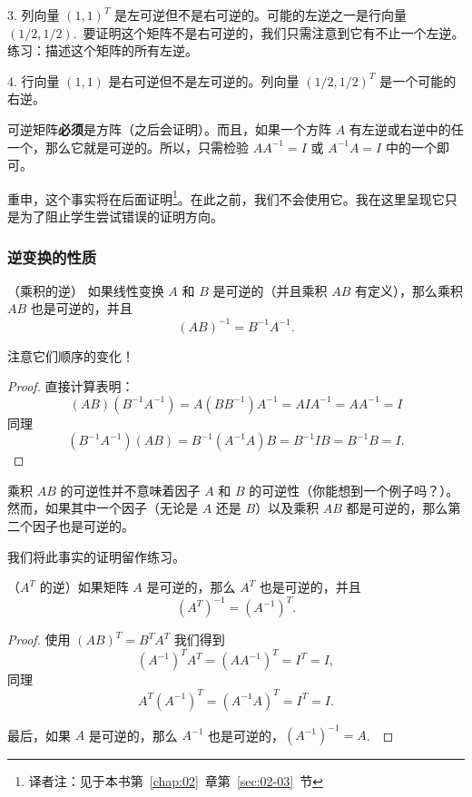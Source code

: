 3. 列向量 $(1, 1)^T$ 是左可逆但不是右可逆的。可能的左逆之一是行向量 $(1/2, 1/2)$.~要证明这个矩阵不是右可逆的，我们只需注意到它有不止一个左逆。 {\heiti 练习}：描述这个矩阵的所有左逆。

4. 行向量 $(1, 1)$ 是右可逆但不是左可逆的。列向量 $(1/2, 1/2)^T$ 是一个可能的右逆。

\begin{remark}\label{stmt:01-06-02}
可逆矩阵\textbf{必须}是方阵（之后会证明）。而且，如果一个方阵 $A$ 有左逆或右逆中的任一个，那么它就是可逆的。所以，只需检验 $A A^{-1} = I$ 或 $A^{-1} A = I$ 中的一个即可。
\end{remark}

重申，这个事实将在后面证明\footnote{译者注：见于本书第~\ref{chap:02}~章第~\ref{sec:02-03}~节}。在此之前，我们不会使用它。我在这里呈现它只是为了阻止学生尝试错误的证明方向。

\subsubsection{逆变换的性质}\label{sec:01-06-02-02}

\begin{theorem}\label{stmt:01-06-03} （乘积的逆） 如果线性变换 $A$ 和 $B$ 是可逆的（并且乘积 $AB$ 有定义），那么乘积 $AB$ 也是可逆的，并且 $$(AB)^{-1} = B^{-1} A^{-1}.$$\end{theorem}
注意它们顺序的变化！

\begin{proof} 直接计算表明：$$(AB)(B^{-1} A^{-1}) = A(BB^{-1})A^{-1} = AIA^{-1} = AA^{-1} = I$$
同理
$$(B^{-1} A^{-1})(AB) = B^{-1}(A^{-1} A)B = B^{-1}IB = B^{-1}B = I.$$\end{proof}

\begin{remark}\label{stmt:01-06-04}
乘积 $AB$ 的可逆性并不意味着因子 $A$ 和 $B$ 的可逆性（你能想到一个例子吗？）。然而，如果其中一个因子（无论是 $A$ 还是 $B$）以及乘积 $AB$ 都是可逆的，那么第二个因子也是可逆的。
\end{remark}

我们将此事实的证明留作练习。

\begin{theorem}\label{stmt:01-06-05} （$A^T$ 的逆）如果矩阵 $A$ 是可逆的，那么 $A^T$ 也是可逆的，并且 $$(A^T)^{-1} = (A^{-1})^T.$$\end{theorem}

\begin{proof} 使用 $(AB)^T = B^T A^T$ 我们得到 $$(A^{-1})^T A^T = (AA^{-1})^T = I^T = I,$$
同理
$$A^T (A^{-1})^T = (A^{-1} A)^T = I^T = I.$$

最后，如果 $A$ 是可逆的，那么 $A^{-1}$ 也是可逆的，$(A^{-1})^{-1} = A$.~\end{proof}

